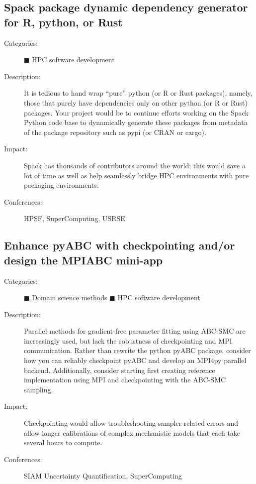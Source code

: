 \documentclass[12pt]{article}
\begin{document}
\subsection{Spack package dynamic dependency generator for R, python, or Rust}
\begin{description}
\item[Categories:]
  \textcolor{blue!80!black}{$\blacksquare$} HPC software development
\item[Description:] It is tedious to hand wrap %
  ``pure'' python (or R or Rust packages), %
  namely, those that purely have dependencies only on other %
  python (or R or Rust) packages.
  Your project would be to continue efforts %
  working on the Spack Python code base %
  to dynamically generate these packages %
  from metadata of the package repository such as pypi (or CRAN or cargo).
\item[Impact:] Spack has thousands of contributors around the world; %
  this would save a lot of time %
  as well as help seamlessly bridge HPC environments %
  with pure packaging environments.
\item[Conferences:] HPSF, SuperComputing, USRSE
\end{description}

\subsection{Enhance pyABC with checkpointing and/or design the MPIABC mini-app}
\begin{description}
\item[Categories:]
  \textcolor{green!50!black}{$\blacksquare$} Domain science methods
  \textcolor{blue!80!black}{$\blacksquare$} HPC software development
\item[Description:] Parallel methods for gradient-free parameter fitting %
  using ABC-SMC are increasingly used, %
  but lack the robustness of checkpointing and MPI communication.
  Rather than rewrite the python pyABC package, %
  consider how you can reliably checkpoint pyABC %
  and develop an MPI4py parallel backend.
  Additionally, %
  consider starting first creating reference implementation %
  using MPI and checkpointing with the ABC-SMC sampling.
\item[Impact:] Checkpointing would allow troubleshooting %
  sampler-related errors %
  and allow longer calibrations %
  of complex mechanistic models %
  that each take several hours to compute.
\item[Conferences:] SIAM Uncertainty Quantification, SuperComputing
\end{description}
\end{document}
